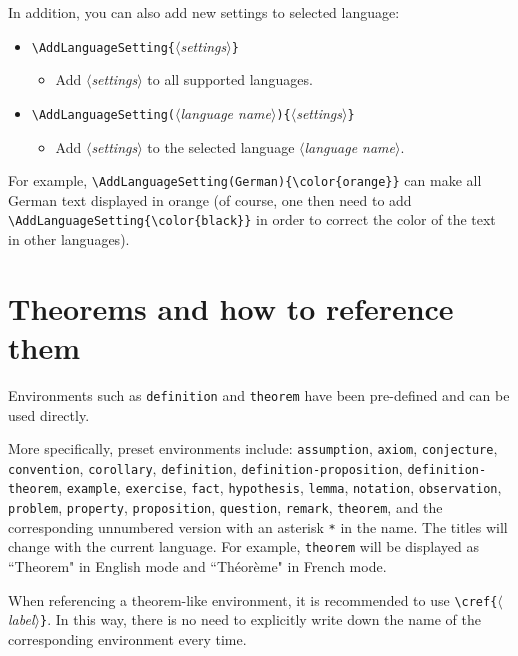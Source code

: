 \documentclass[allowbf,puretext]{beaulivre}
\theoremstyle{basic}
\theoremstyle{emphasis}
\theoremstyle{simple}
\providecommand{\meta}[1]{$\langle${\normalfont\itshape#1}$\rangle$}
\begin{document}
\medskip
In addition, you can also add new settings to selected language:
\begin{itemize}
    \item \lstinline|\AddLanguageSetting{|\meta{settings}\lstinline|}|
    \begin{itemize}
        \item Add \meta{settings} to all supported languages.
    \end{itemize}
    \item \lstinline|\AddLanguageSetting(|\meta{language name}\lstinline|){|\meta{settings}\lstinline|}|
    \begin{itemize}
        \item Add \meta{settings} to the selected language \meta{language name}.
    \end{itemize}
\end{itemize}
For example, \lstinline|\AddLanguageSetting(German){\color{orange}}| can make all German text displayed in orange (of course, one then need to add \lstinline|\AddLanguageSetting{\color{black}}| in order to correct the color of the text in other languages).


\section{Theorems and how to reference them}

Environments such as \texttt{definition} and \texttt{theorem} have been pre-defined and can be used directly. 

More specifically, preset environments include: 
\texttt{assumption}, \texttt{axiom}, \texttt{conjecture}, \texttt{convention}, \texttt{corollary}, \texttt{definition}, \texttt{definition-proposition}, \texttt{definition-theorem}, \texttt{example}, \texttt{exercise}, \texttt{fact}, \texttt{hypothesis}, \texttt{lemma}, \texttt{notation}, \texttt{observation}, \texttt{problem}, \texttt{property}, \texttt{proposition}, \texttt{question}, \texttt{remark}, \texttt{theorem}, and the corresponding unnumbered version with an asterisk \lstinline|*| in the name. The titles will change with the current language. For example, \texttt{theorem} will be displayed as ``Theorem" in English mode and ``Théorème" in French mode.

\medskip
When referencing a theorem-like environment, it is recommended to use \lstinline|\cref{|\meta{label}\texttt{\}}. In this way, there is no need to explicitly write down the name of the corresponding environment every time.
\end{document}

